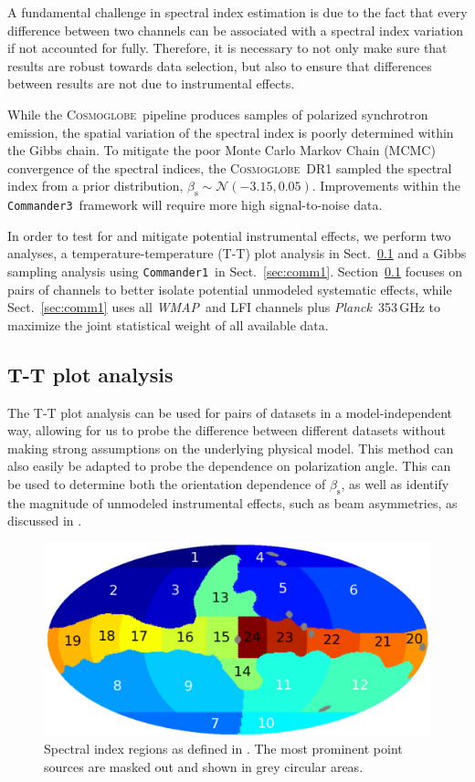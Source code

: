 \documentclass[twocolumn]{../../common/aa}
\def\WMAP{\emph{WMAP}}
\def\Planck{\emph{Planck}}
\def\commanderone{\texttt{Commander1}}
\def\commanderthree{\texttt{Commander3}}
\newcommand{\cosmoglobe}{\textsc{Cosmoglobe}}
\begin{document}
A fundamental challenge in spectral index estimation is due to the fact that every difference between two channels can be associated with a spectral index variation if not accounted for fully. Therefore, it is necessary to not only make sure that results are robust towards data selection, but also to ensure that differences between results are not due to instrumental effects.


While the \cosmoglobe\ pipeline produces samples of polarized synchrotron emission, the spatial variation of the spectral index is poorly determined within the Gibbs chain. To mitigate the poor Monte Carlo Markov Chain (MCMC) convergence of the spectral indices, the \cosmoglobe\ DR1 sampled the spectral index from a prior distribution, $\beta_\mathrm s\sim\mathcal N(-3.15, 0.05)$. Improvements within the \commanderthree\ framework will require more high signal-to-noise data.

In order to test for and mitigate potential instrumental effects, we perform two analyses, a temperature-temperature (T-T) plot analysis in Sect.~\ref{sec:tt_plot} and a Gibbs sampling analysis using \commanderone\ in Sect.~\ref{sec:comm1}. Section~\ref{sec:tt_plot} focuses on pairs of channels to better isolate potential unmodeled systematic effects, while Sect.~\ref{sec:comm1} uses all \WMAP\ and LFI channels plus \Planck\ 353\,GHz to maximize the joint statistical weight of all available data.

\subsection{T-T plot analysis}
\label{sec:tt_plot}

The T-T plot analysis can be used for pairs of datasets in a model-independent way, allowing for us to probe the difference between different datasets without making strong assumptions on the underlying physical model. This method can also easily be adapted to probe the dependence on polarization angle. This can be used to determine both the orientation dependence of $\beta_\mathrm s$, as well as identify the magnitude of unmodeled instrumental effects, such as beam asymmetries, as discussed in \citet{wehus:2013}.


\begin{figure}
        \centering
        \includegraphics[width=\linewidth]{figures/utnymaske_tall_converted.pdf}
        \caption{Spectral index regions as defined in \citet{fuskeland2014}. The most prominent point sources are masked out and shown in grey circular areas.
        }
        \label{fig:regions}
\end{figure}
\end{document}

